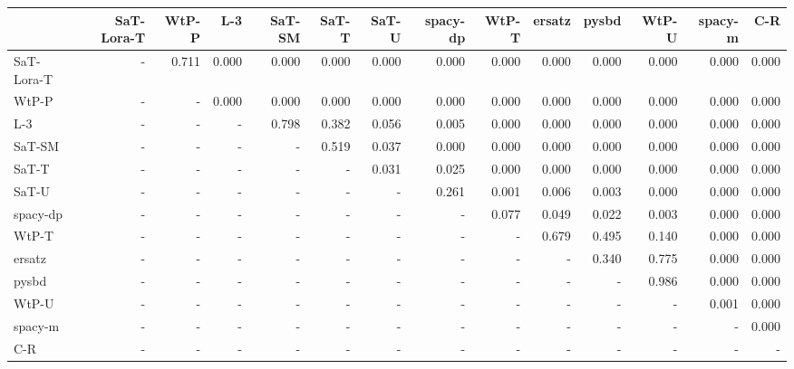 \begin{tabular}{lrrrrrrrrrrrrr}
\toprule
 & SaT-Lora-T & WtP-P & L-3 & SaT-SM & SaT-T & SaT-U & spacy-dp & WtP-T & ersatz & pysbd & WtP-U & spacy-m & C-R \\
\midrule
SaT-Lora-T & - & 0.711 & 0.000 & 0.000 & 0.000 & 0.000 & 0.000 & 0.000 & 0.000 & 0.000 & 0.000 & 0.000 & 0.000 \\
WtP-P & - & - & 0.000 & 0.000 & 0.000 & 0.000 & 0.000 & 0.000 & 0.000 & 0.000 & 0.000 & 0.000 & 0.000 \\
L-3 & - & - & - & 0.798 & 0.382 & 0.056 & 0.005 & 0.000 & 0.000 & 0.000 & 0.000 & 0.000 & 0.000 \\
SaT-SM & - & - & - & - & 0.519 & 0.037 & 0.000 & 0.000 & 0.000 & 0.000 & 0.000 & 0.000 & 0.000 \\
SaT-T & - & - & - & - & - & 0.031 & 0.025 & 0.000 & 0.000 & 0.000 & 0.000 & 0.000 & 0.000 \\
SaT-U & - & - & - & - & - & - & 0.261 & 0.001 & 0.006 & 0.003 & 0.000 & 0.000 & 0.000 \\
spacy-dp & - & - & - & - & - & - & - & 0.077 & 0.049 & 0.022 & 0.003 & 0.000 & 0.000 \\
WtP-T & - & - & - & - & - & - & - & - & 0.679 & 0.495 & 0.140 & 0.000 & 0.000 \\
ersatz & - & - & - & - & - & - & - & - & - & 0.340 & 0.775 & 0.000 & 0.000 \\
pysbd & - & - & - & - & - & - & - & - & - & - & 0.986 & 0.000 & 0.000 \\
WtP-U & - & - & - & - & - & - & - & - & - & - & - & 0.001 & 0.000 \\
spacy-m & - & - & - & - & - & - & - & - & - & - & - & - & 0.000 \\
C-R & - & - & - & - & - & - & - & - & - & - & - & - & - \\
\bottomrule
\end{tabular}

